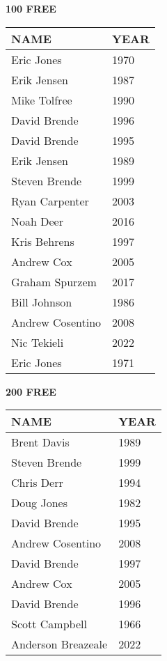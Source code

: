 \begin{minipage}[t]{0.48\textwidth}
\centering
\textbf{100 FREE}\\[0.05cm]
\begin{tabular}{@{}p{2.8cm}p{1.2cm}@{}}
\hline
\textbf{NAME} & \textbf{YEAR} \\
\hline
Eric Jones & 1970 \\
Erik Jensen & 1987 \\
Mike Tolfree & 1990 \\
David Brende & 1996 \\
David Brende & 1995 \\
Erik Jensen & 1989 \\
Steven Brende & 1999 \\
Ryan Carpenter & 2003 \\
Noah Deer & 2016 \\
Kris Behrens & 1997 \\
Andrew Cox & 2005 \\
Graham Spurzem & 2017 \\
Bill Johnson & 1986 \\
Andrew Cosentino & 2008 \\
Nic Tekieli & 2022 \\
Eric Jones & 1971 \\
\hline
\end{tabular}
\end{minipage}

\vspace{0.4cm}

\begin{center}
\begin{minipage}[t]{0.7\textwidth}
\centering
\textbf{200 FREE}\\[0.05cm]
\begin{tabular}{@{}p{2.8cm}p{1.2cm}@{}}
\hline
\textbf{NAME} & \textbf{YEAR} \\
\hline
Brent Davis & 1989 \\
Steven Brende & 1999 \\
Chris Derr & 1994 \\
Doug Jones & 1982 \\
David Brende & 1995 \\
Andrew Cosentino & 2008 \\
David Brende & 1997 \\
Andrew Cox & 2005 \\
David Brende & 1996 \\
Scott Campbell & 1966 \\
Anderson Breazeale & 2022 \\
\hline
\end{tabular}
\end{minipage}
\end{center}

